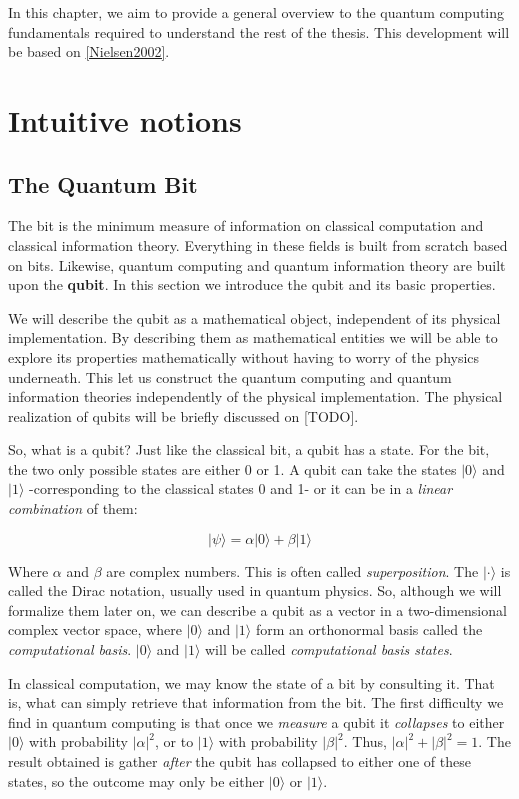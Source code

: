 	In this chapter, we aim to provide a general overview to the quantum computing fundamentals required to understand the rest of the thesis. This development will be based on \ref{Nielsen2002}.
	
	\section{Intuitive notions}
	
	\subsection{The Quantum Bit}
	
	The bit is the minimum measure of information on classical computation and classical information theory. Everything in these fields is built from scratch based on bits. Likewise, quantum computing and quantum information theory are built upon the \textbf{qubit}. In this section we introduce the qubit and its basic properties.
	
	We will describe the qubit as a mathematical object, independent of its physical implementation. By describing them as mathematical entities we will be able to explore its properties mathematically without having to worry of the physics underneath. This let us construct the quantum computing and quantum information theories independently of the physical implementation. The physical realization of qubits will be briefly discussed on [TODO].
	
	So, what is a qubit? Just like the classical bit, a qubit has a state. For the bit, the two only possible states are either 0 or 1. A qubit can take the states $|0\rangle$ and $|1\rangle$ -corresponding to the classical states 0 and 1- or it can be in a \emph{linear combination} of them:
	
	$$ |\psi\rangle = \alpha |0\rangle + \beta |1\rangle $$
	
	Where $\alpha$ and $\beta$ are complex numbers. This is often called \emph{superposition}. The $| \cdot \rangle$ is called the Dirac notation, usually used in quantum physics. So, although we will formalize them later on, we can describe a qubit as a vector in a two-dimensional complex vector space, where $|0\rangle$ and $|1\rangle$ form an orthonormal basis called the \emph{computational basis}. $|0\rangle$ and $|1\rangle$ will be called \emph{computational basis states}.
	
	In classical computation, we may know the state of a bit by consulting it. That is, what can simply retrieve that information from the bit. The first difficulty we find in quantum computing is that once we \emph{measure} a qubit it \emph{collapses} to either $|0\rangle$ with probability $|\alpha|^2$, or to $|1\rangle$ with probability $|\beta|^2$. Thus, $|\alpha|^2 + |\beta|^2 = 1$. The result obtained is gather \emph{after} the qubit has collapsed to either one of these states, so the outcome may only be either $|0\rangle$ or $|1\rangle$.
	
